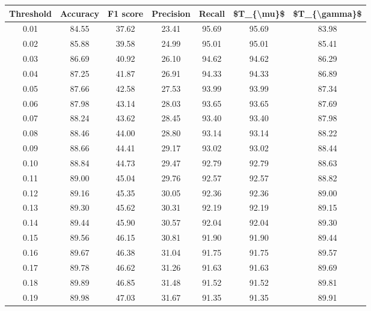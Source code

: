 \begin{tabular}{|c|c|c|c|c|c|c|}
\hline
 Threshold &  Accuracy &  F1 score &  Precision &  Recall &  \$T\_\{\textbackslash mu\}\$ &  \$T\_\{\textbackslash gamma\}\$ \\
\hline
      0.01 &     84.55 &     37.62 &      23.41 &   95.69 &      95.69 &         83.98 \\
      0.02 &     85.88 &     39.58 &      24.99 &   95.01 &      95.01 &         85.41 \\
      0.03 &     86.69 &     40.92 &      26.10 &   94.62 &      94.62 &         86.29 \\
      0.04 &     87.25 &     41.87 &      26.91 &   94.33 &      94.33 &         86.89 \\
      0.05 &     87.66 &     42.58 &      27.53 &   93.99 &      93.99 &         87.34 \\
      0.06 &     87.98 &     43.14 &      28.03 &   93.65 &      93.65 &         87.69 \\
      0.07 &     88.24 &     43.62 &      28.45 &   93.40 &      93.40 &         87.98 \\
      0.08 &     88.46 &     44.00 &      28.80 &   93.14 &      93.14 &         88.22 \\
      0.09 &     88.66 &     44.41 &      29.17 &   93.02 &      93.02 &         88.44 \\
      0.10 &     88.84 &     44.73 &      29.47 &   92.79 &      92.79 &         88.63 \\
      0.11 &     89.00 &     45.04 &      29.76 &   92.57 &      92.57 &         88.82 \\
      0.12 &     89.16 &     45.35 &      30.05 &   92.36 &      92.36 &         89.00 \\
      0.13 &     89.30 &     45.62 &      30.31 &   92.19 &      92.19 &         89.15 \\
      0.14 &     89.44 &     45.90 &      30.57 &   92.04 &      92.04 &         89.30 \\
      0.15 &     89.56 &     46.15 &      30.81 &   91.90 &      91.90 &         89.44 \\
      0.16 &     89.67 &     46.38 &      31.04 &   91.75 &      91.75 &         89.57 \\
      0.17 &     89.78 &     46.62 &      31.26 &   91.63 &      91.63 &         89.69 \\
      0.18 &     89.89 &     46.85 &      31.48 &   91.52 &      91.52 &         89.81 \\
      0.19 &     89.98 &     47.03 &      31.67 &   91.35 &      91.35 &         89.91 \\

\end{tabular}
